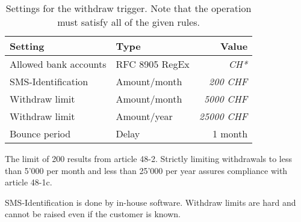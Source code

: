 \begin{table}[h!]
  \caption{Settings for the withdraw trigger. Note that the operation
  must satisfy all of the given rules.} \label{table:kyc:withdraw:settings}
  \begin{tabular}{l|l|r}
    {\bf Setting}            & {\bf Type}         &  {\bf Value}     \\ \hline \hline
    Allowed bank accounts    & RFC 8905 RegEx     &  {\em CH*}       \\ \hline
    SMS-Identification       & Amount/month       &  {\em 200 CHF}   \\
    Withdraw limit           & Amount/month       &  {\em 5000 CHF}  \\
    Withdraw limit           & Amount/year        &  {\em 25000 CHF} \\
    Bounce period            & Delay              &  1 month         \\
  \end{tabular}
\end{table}

The limit of 200 \CURRENCY{} results from article 48-2.  Strictly limiting
withdrawals to less than 5'000 \CURRENCY{} per month and less than 25'000
\CURRENCY{} per year assures compliance with article 48-1c.

SMS-Identification is done by in-house software.  Withdraw limits are
hard and cannot be raised even if the customer is known.

